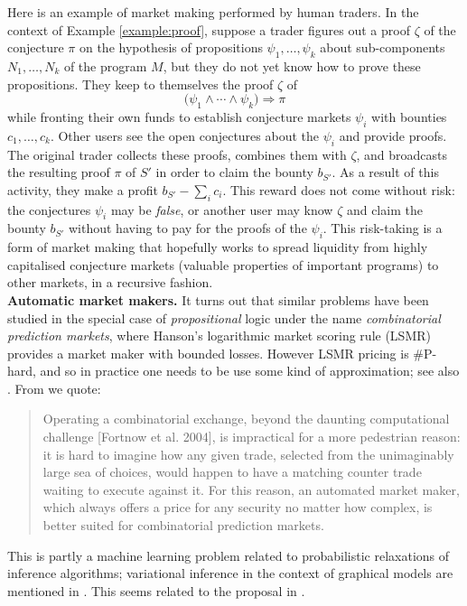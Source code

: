 \documentclass[english,letter paper,12pt,reqno]{article}
\theoremstyle{example}
\begin{document}
Here is an example of market making performed by human traders. In the context of Example \ref{example:proof}, suppose a trader figures out a proof $\zeta$ of the conjecture $\pi$ on the hypothesis of propositions $\psi_1,\ldots,\psi_k$ about sub-components $N_1,\ldots,N_k$ of the program $M$, but they do not yet know how to prove these propositions. They keep to themselves the proof $\zeta$ of
\[
\big( \psi_1 \land \cdots \land \psi_k \big) \Longrightarrow \pi
\]
while fronting their own funds to establish conjecture markets $\psi_i$ with bounties $c_1,\ldots,c_k$. Other users see the open conjectures about the $\psi_i$ and provide proofs. The original trader collects these proofs, combines them with $\zeta$, and broadcasts the resulting proof $\pi$ of $S'$ in order to claim the bounty $b_{S'}$. As a result of this activity, they make a profit $b_{S'} - \sum_i c_i$. This reward does not come without risk: the conjectures $\psi_i$ may be \emph{false}, or another user may know $\zeta$ and claim the bounty $b_{S'}$ without having to pay for the proofs of the $\psi_i$. This risk-taking is a form of market making that hopefully works to spread liquidity from highly capitalised conjecture markets (valuable properties of important programs) to other markets, in a recursive fashion.
\\

\textbf{Automatic market makers.} It turns out that similar problems have been studied in the special case of \emph{propositional} logic under the name \emph{combinatorial prediction markets}, where Hanson's logarithmic market scoring rule (LSMR) \cite{hanson} provides a market maker with bounded losses. However LSMR pricing is \#P-hard, and so in practice one needs to be use some kind of approximation; see also \cite{chen,dudik,pennock}. From \cite{dudik} we quote:
\begin{quote}
Operating a combinatorial exchange, beyond the daunting computational challenge [Fortnow et al. 2004], is impractical for a more pedestrian reason: it is hard to imagine how any given trade, selected from the unimaginably large sea of choices, would happen to have a matching counter trade waiting to execute against it. For this reason, an automated market maker, which always offers a price for any security no matter how complex, is better suited for combinatorial prediction markets.
\end{quote}
This is partly a machine learning problem related to probabilistic relaxations of inference algorithms; variational inference in the context of graphical models are mentioned in \cite{dudik}. This seems related to the proposal in \cite{garrabrant}.%
\end{document}
